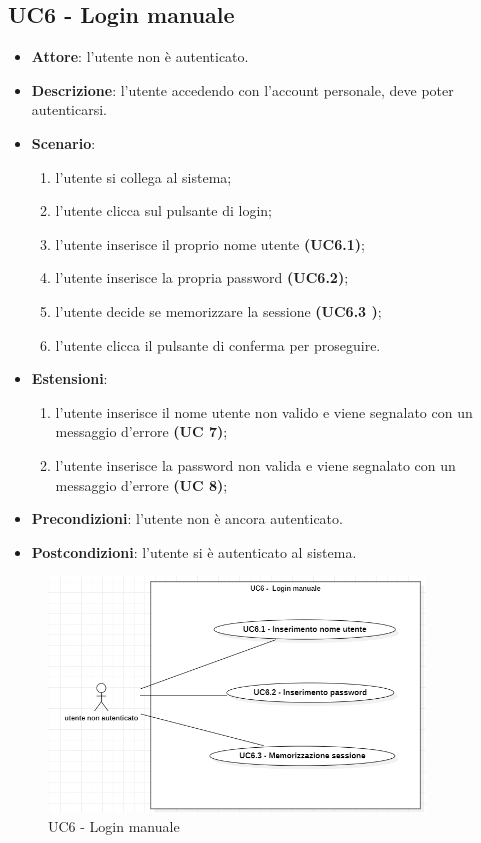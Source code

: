 \subsection{UC6 - Login manuale}

\begin{itemize}
    \item \textbf{Attore}: l'utente non è autenticato.
    \item \textbf{Descrizione}: l'utente accedendo con l'account personale, deve poter autenticarsi.
    \item \textbf{Scenario}:
    \begin{enumerate}
        \item l'utente si collega al sistema;
        \item l'utente clicca sul pulsante di login;
        \item l'utente inserisce il proprio nome utente \textbf{(UC6.1)};
        \item l'utente inserisce la propria password \textbf{(UC6.2)};
        \item l'utente decide se memorizzare la sessione \textbf{(UC6.3 )};
        \item l'utente clicca il pulsante di conferma per proseguire.
    \end{enumerate}
    \item \textbf{Estensioni}:
        \begin{enumerate}
            \item l'utente inserisce il nome utente non valido e viene segnalato con un messaggio d'errore \textbf{(UC 7)};
            \item l'utente inserisce la password non valida e viene segnalato con un messaggio d'errore \textbf{(UC 8)};
        \end{enumerate}

    \item \textbf{Precondizioni}: l'utente non è ancora autenticato.
    \item \textbf{Postcondizioni}: l'utente si è autenticato al sistema.
\end{itemize}

\begin{figure}[!h]
    \includegraphics[width=10cm]{sezioni/Images/UC6-Manuale.png}
    \centering
    \caption{UC6 - Login manuale}
\end{figure}

